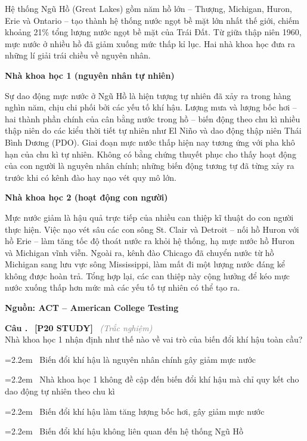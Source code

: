 \documentclass[12pt,a4paper,twoside]{article}
\newcounter{qcounter}
\newcommand{\question}[2][]{%
    \stepcounter{qcounter}%
    \par\vspace{5pt}%
    \noindent\textcolor{primaryBlue}{\textbf{Câu \theqcounter.}}~%
    \textcolor{secondaryBlue}{\small\textbf{[P20 STUDY]}}~%
    \if\relax\detokenize{#1}\relax\else\textcolor{gray}{\small\textit{(#1)}}~\fi\\[1pt]
    \noindent #2%
}
\newcommand{\choiceitem}[2]{%
    \tikz[baseline=-0.5ex]{
        \node[draw=primaryBlue, circle, minimum size=1.5em, inner sep=0pt, thick] {\textbf{#1}};
    }~#2%
}
\newenvironment{readingpassage}[1][]{%
    \begin{tcolorbox}[enhanced, colback=grayLight, colframe=secondaryBlue,
        coltitle=textDark, fonttitle=\bfseries, title={#1},
        rounded corners, arc=3mm, boxrule=1pt,
        left=15pt, right=15pt, top=10pt, bottom=10pt,
        breakable, before skip=10pt, after skip=10pt, drop fuzzy shadow]
    \setstretch{1.3}
}{\end{tcolorbox}}
\begin{document}
\begin{readingpassage}
Hệ thống Ngũ Hồ (Great Lakes) gồm năm hồ lớn -- Thượng, Michigan, Huron, Erie và Ontario -- tạo thành hệ thống nước ngọt bề mặt lớn nhất thế giới, chiếm khoảng 21\% tổng lượng nước ngọt bề mặt của Trái Đất. Từ giữa thập niên 1960, mực nước ở nhiều hồ đã giảm xuống mức thấp kỉ lục. Hai nhà khoa học đưa ra những lí giải trái chiều về nguyên nhân.

\textbf{Nhà khoa học 1 (nguyên nhân tự nhiên)}

Sự dao động mực nước ở Ngũ Hồ là hiện tượng tự nhiên đã xảy ra trong hàng nghìn năm, chịu chi phối bởi các yếu tố khí hậu. Lượng mưa và lượng bốc hơi -- hai thành phần chính của cân bằng nước trong hồ -- biến động theo chu kì nhiều thập niên do các kiểu thời tiết tự nhiên như El Niño và dao động thập niên Thái Bình Dương (PDO). Giai đoạn mực nước thấp hiện nay tương ứng với pha khô hạn của chu kì tự nhiên. Không có bằng chứng thuyết phục cho thấy hoạt động của con người là nguyên nhân chính; những biến động tương tự đã từng xảy ra trước khi có kênh đào hay nạo vét quy mô lớn.

\textbf{Nhà khoa học 2 (hoạt động con người)}

Mực nước giảm là hậu quả trực tiếp của nhiều can thiệp kĩ thuật do con người thực hiện. Việc nạo vét sâu các con sông St. Clair và Detroit -- nối hồ Huron với hồ Erie -- làm tăng tốc độ thoát nước ra khỏi hệ thống, hạ mực nước hồ Huron và Michigan vĩnh viễn. Ngoài ra, kênh đào Chicago đã chuyển nước từ hồ Michigan sang lưu vực sông Mississippi, làm mất đi một lượng nước đáng kể không được hoàn trả. Tổng hợp lại, các can thiệp này cộng hưởng để kéo mực nước xuống thấp hơn mức mà các yếu tố tự nhiên có thể tạo ra.

\hfill\textbf{Nguồn: ACT -- American College Testing}
\end{readingpassage}

\question[Trắc nghiệm]{Nhà khoa học 1 nhận định như thế nào về vai trò của biến đổi khí hậu toàn cầu?}
\par\vspace{4pt}
\noindent\hangindent=2.2em\choiceitem{A}{Biến đổi khí hậu là nguyên nhân chính gây giảm mực nước}\par\vspace{4pt}
\noindent\hangindent=2.2em\choiceitem{B}{Nhà khoa học 1 không đề cập đến biến đổi khí hậu mà chỉ quy kết cho dao động tự nhiên theo chu kì}\par\vspace{4pt}
\noindent\hangindent=2.2em\choiceitem{C}{Biến đổi khí hậu làm tăng lượng bốc hơi, gây giảm mực nước}\par\vspace{4pt}
\noindent\hangindent=2.2em\choiceitem{D}{Biến đổi khí hậu không liên quan đến hệ thống Ngũ Hồ}\par\vspace{4pt}
\end{document}
